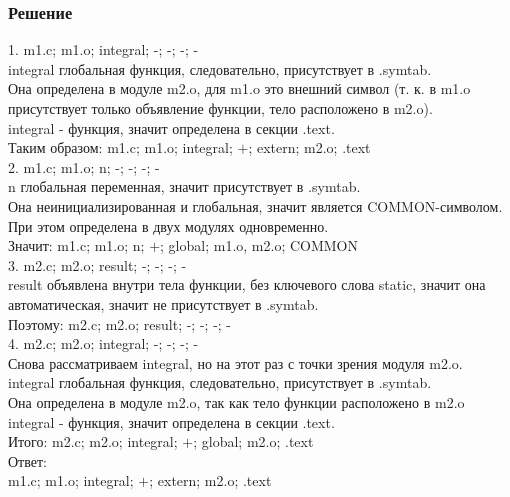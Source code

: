 \documentclass[12pt, letterpaper]{article}
\begin{document}
\subsubsection{Решение}
1. m1.c; m1.o; integral; -; -; -; -\\
integral глобальная функция, следовательно, присутствует в .symtab.\\
Она определена в модуле m2.o, для m1.o это внешний символ (т. к. в m1.o присутствует только объявление функции, тело расположено в m2.o).\\
integral - функция, значит определена в секции .text.\\

Таким образом: m1.c; m1.o; integral; $+$; extern; m2.o; .text\\

2. m1.c; m1.o; n; -; -; -; -\\
n глобальная переменная, значит присутствует в .symtab.\\
Она неинициализированная и глобальная, значит является COMMON-символом.\\
При этом определена в двух модулях одновременно.\\

Значит: m1.c; m1.o; n; $+$; global; m1.o, m2.o; COMMON\\

3. m2.c; m2.o; result; -; -; -; -\\
result объявлена внутри тела функции, без ключевого слова static, значит она автоматическая, значит не присутствует в .symtab.\\

Поэтому: m2.c; m2.o; result; -; -; -; -\\

4. m2.c; m2.o; integral; -; -; -; -\\
Снова рассматриваем integral, но на этот раз с точки зрения модуля m2.o.
integral глобальная функция, следовательно, присутствует в .symtab.\\
Она определена в модуле m2.o, так как тело функции расположено в m2.o\\
integral - функция, значит определена в секции .text.\\

Итого: m2.c; m2.o; integral; $+$; global; m2.o; .text\\

Ответ:\\

m1.c; m1.o; integral; $+$; extern; m2.o; .text
\end{document}
